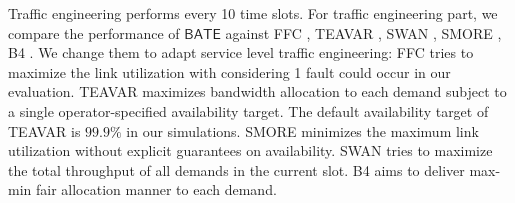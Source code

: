 \documentclass[sigconf]{acmart}
\begin{document}
Traffic engineering performs every 10 time slots.
For traffic engineering part, we compare the performance of $\mathsf{BATE}$ against FFC \cite{FFC}, TEAVAR \cite{Teavar}, SWAN \cite{swan}, SMORE \cite{SMORE}, B4 \cite{B4}.
We change them to adapt service level traffic engineering: 
FFC tries to maximize the link utilization with considering 1 fault could occur in our evaluation.
TEAVAR maximizes bandwidth allocation to each demand subject to a single operator-specified availability target.
The default availability target of TEAVAR is $99.9\%$ in our simulations.
SMORE \cite{SMORE} minimizes the maximum link utilization without explicit guarantees on availability.
SWAN \cite{swan}  tries to  maximize the total throughput of all demands in the current slot.
B4 \cite{B4} aims to deliver max-min fair allocation manner to each demand.
\end{document}
